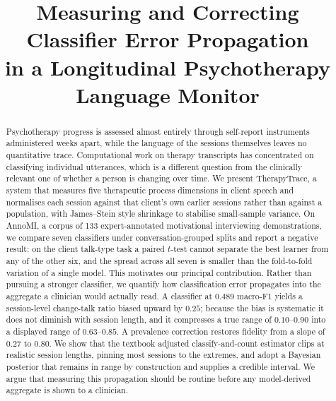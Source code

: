 \documentclass[conference]{IEEEtran}
\begin{document}
\title{Measuring and Correcting Classifier Error Propagation\\
in a Longitudinal Psychotherapy Language Monitor}

\author{
}

\maketitle

\begin{abstract}
Psychotherapy progress is assessed almost entirely through self-report
instruments administered weeks apart, while the language of the sessions
themselves leaves no quantitative trace. Computational work on therapy
transcripts has concentrated on classifying individual utterances, which is a
different question from the clinically relevant one of whether a person is
changing over time. We present TherapyTrace, a system that measures five
therapeutic process dimensions in client speech and normalises each session
against that client's own earlier sessions rather than against a population,
with James--Stein style shrinkage to stabilise small-sample variance. On
AnnoMI, a corpus of 133 expert-annotated motivational interviewing
demonstrations, we compare seven classifiers under conversation-grouped splits
and report a negative result: on the client talk-type task a paired $t$-test
cannot separate the best learner from any of the other six, and the spread
across all seven is smaller than the fold-to-fold variation of a single model.
This motivates our principal contribution. Rather than pursuing a stronger
classifier, we quantify how classification error propagates into the aggregate
a clinician would actually read. A classifier at $0.489$ macro-F1 yields a
session-level change-talk ratio biased upward by $0.25$; because the bias is
systematic it does not diminish with session length, and it compresses a true
range of $0.10$--$0.90$ into a displayed range of $0.63$--$0.85$. A prevalence
correction restores fidelity from a slope of $0.27$ to $0.80$. We show that the
textbook adjusted classify-and-count estimator clips at realistic session
lengths, pinning most sessions to the extremes, and adopt a Bayesian posterior
that remains in range by construction and supplies a credible interval. We
argue that measuring this propagation should be routine before any
model-derived aggregate is shown to a clinician.
\end{abstract}
\end{document}
